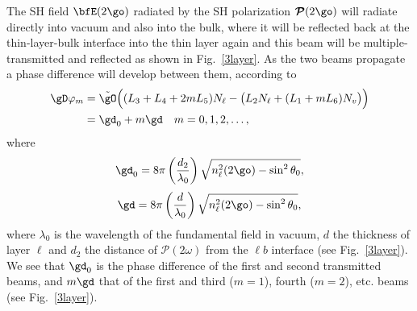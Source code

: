 \documentclass[aps,11pt]{revtex4}
\begin{document}
The SH field $\bfE(2\go)$ radiated by the SH polarization 
$\boldsymbol{\mathcal{P}}(2\go)$
will radiate directly into vacuum and also into the bulk,
where it will be reflected back at the thin-layer-bulk interface into 
the thin layer again and this beam will be multiple-transmitted and 
reflected as shown in Fig.~\ref{3layer}. 
As the two beams propagate a phase difference will develop between
them, according to
\begin{align}\label{m99}
\gD\varphi_m&=\tilde\gO\Big((L_3+L_4+2mL_5)N_\ell
-\big( L_2N_\ell+(L_1+mL_6)N_v\big)
\Big)
\nonumber\\
&=\gd_0 + m\gd\quad m=0,1,2,\ldots
,
\end{align}
where
\begin{align}\label{m97}
\gd_0=8\pi\left(\frac{d_2}{\lambda_0}\right)\sqrt{n^2_\ell(2\go)-\sin^2\theta_0}
,
\end{align}
\begin{align}\label{m96}
\gd=8\pi\left(\frac{d}{\lambda_0}\right)\sqrt{n^2_\ell(2\go)-\sin^2\theta_0}
,
\end{align}
where $\lambda_0$ is the wavelength of the fundamental field in
vacuum, $d$ the thickness of layer $\ell$ and $d_2$ the distance of
$\boldsymbol{\mathcal{P}}(2\omega)$  
from the $\ell b$ interface 
(see Fig.~\ref{3layer}).
We see that
$\gd_0$ is the phase difference of 
the first and second transmitted beams, and $m\gd$ that of the first 
and  third ($m=1$), fourth ($m=2$), etc. beams (see 
Fig.~\ref{3layer}). 
\end{document}
